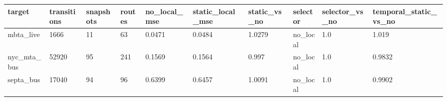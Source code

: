 \begin{tabular}{llllllllll}
\toprule
target & transitions & snapshots & routes & no\_local\_mse & static\_local\_mse & static\_vs\_no & selector & selector\_vs\_no & temporal\_static\_vs\_no \\
\midrule
mbta\_live & 1666 & 11 & 63 & 0.0471 & 0.0484 & 1.0279 & no\_local & 1.0 & 1.019 \\
nyc\_mta\_bus & 52920 & 95 & 241 & 0.1569 & 0.1564 & 0.997 & no\_local & 1.0 & 0.9832 \\
septa\_bus & 17040 & 94 & 96 & 0.6399 & 0.6457 & 1.0091 & no\_local & 1.0 & 0.9902 \\
\bottomrule
\end{tabular}
